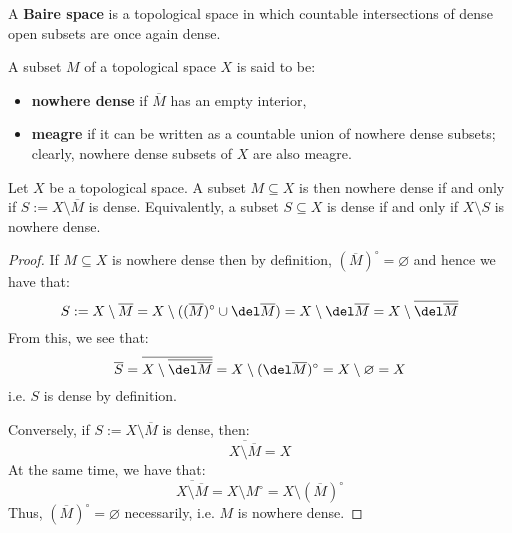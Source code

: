         \begin{definition} \label{def: baire_spaces}
            A \textbf{Baire space} is a topological space in which countable intersections of dense open subsets are once again dense.
        \end{definition}
        \begin{definition} \label{def: nowhere_dense_and_meagre_subsets}
            A subset $M$ of a topological space $X$ is said to be:
            \begin{itemize}
                \item \textbf{nowhere dense} if $\overline{M}$ has an empty interior,
                \item \textbf{meagre} if it can be written as a countable union of nowhere dense subsets; clearly, nowhere dense subsets of $X$ are also meagre. 
            \end{itemize}
        \end{definition}
        \begin{lemma} \label{lemma: nowhere_dense_subsets_are_complements_of_dense_subsets}
            Let $X$ be a topological space. A subset $M \subseteq X$ is then nowhere dense if and only if $S := X \setminus \overline{M}$ is dense. Equivalently, a subset $S \subseteq X$ is dense if and only if $X \setminus S$ is nowhere dense.
        \end{lemma}
            \begin{proof}
                If $M \subseteq X$ is nowhere dense then by definition, $(\overline{M})^{\circ} = \varnothing$ and hence we have that:
                    $$S := X \setminus \overline{M} = X \setminus ( (\overline{M})^{\circ} \cup \del \overline{M} ) = X \setminus \del \overline{M} = X \setminus \overline{\del \overline{M}}$$
                From this, we see that:
                    $$\overline{S} = \overline{X \setminus \overline{\del \overline{M}}} = X \setminus (\del \overline{M})^{\circ} = X \setminus \varnothing = X$$
                i.e. $S$ is dense by definition.
                
                Conversely, if $S := X \setminus \overline{M}$ is dense, then:
                    $$\overline{ X \setminus \overline{M} } = X$$
                At the same time, we have that:
                    $$\overline{ X \setminus \overline{M} } = X \setminus M^{\circ} = X \setminus (\overline{M})^{\circ}$$
                Thus, $(\overline{M})^{\circ} = \varnothing$ necessarily, i.e. $M$ is nowhere dense.
            \end{proof}
        
